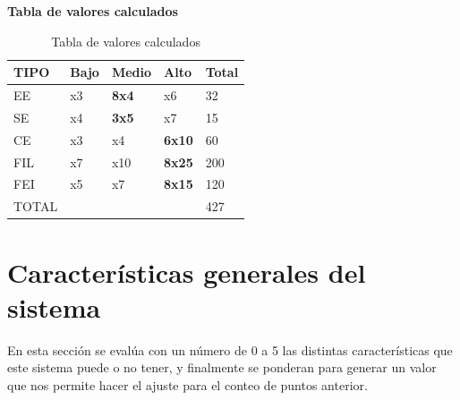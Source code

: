 \documentclass[a4paper,12pt,openany,oneside]{book}
\begin{document}
\begin{table}
\textbf{Tabla de valores calculados}\\
\begin{tabular}{| l | l | l | l | l |}
\hline
\textbf{TIPO} & \textbf{Bajo} & \textbf{Medio} & \textbf{Alto} & \textbf{Total} \\
\hline
EE & x3  & \textbf{8x4}  & x6 & 32\\
\hline
SE & x4  & \textbf{3x5}  & x7 & 15\\
\hline
CE & x3  & x4  & \textbf{6x10} & 60\\
\hline
FIL & x7 & x10 & \textbf{8x25} & 200\\
\hline
FEI & x5 & x7 & \textbf{8x15} & 120\\
\hline
TOTAL &  &  & & 427\\
\hline
\end{tabular}
\caption{Tabla de valores calculados}
\end{table}

\section{Características generales del sistema}

En esta sección se evalúa con un número de 0 a 5 las distintas características que este sistema puede o no tener, y finalmente se ponderan para generar un valor que nos permite hacer el ajuste para el conteo de puntos anterior.
\end{document}
